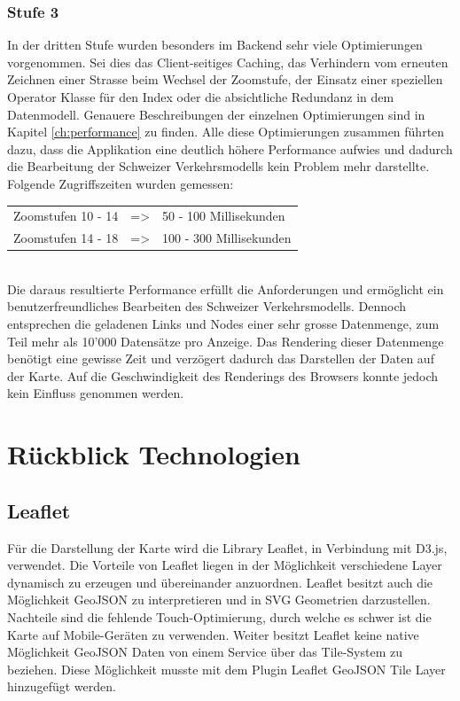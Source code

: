 \subsubsection*{Stufe 3}
In der dritten Stufe wurden besonders im Backend sehr viele Optimierungen vorgenommen. Sei dies das Client-seitiges Caching, das Verhindern vom erneuten Zeichnen einer Strasse beim Wechsel der Zoomstufe, der Einsatz einer speziellen Operator Klasse für den Index oder die absichtliche Redundanz in dem Datenmodell. Genauere Beschreibungen der einzelnen Optimierungen sind in Kapitel \ref{ch:performance}  zu finden. Alle diese Optimierungen zusammen führten dazu, dass die Applikation eine deutlich höhere Performance aufwies und dadurch die Bearbeitung der Schweizer Verkehrsmodells kein Problem mehr darstellte.\\
Folgende Zugriffszeiten wurden gemessen:\\[0.3cm]
\begin{tabular}{ l c l}
Zoomstufen 10 - 14 & => & 50 - 100 Millisekunden \\
Zoomstufen 14 - 18 & => & 100 - 300 Millisekunden \\ 
\end{tabular}\\[0.3cm]
Die daraus resultierte Performance erfüllt die Anforderungen und ermöglicht ein benutzerfreundliches Bearbeiten des Schweizer Verkehrsmodells. Dennoch entsprechen die geladenen Links und Nodes einer sehr grosse Datenmenge, zum Teil mehr als 10'000 Datensätze pro Anzeige. Das Rendering dieser Datenmenge benötigt eine gewisse Zeit und verzögert dadurch das Darstellen der Daten auf der Karte. Auf die Geschwindigkeit des Renderings des Browsers konnte jedoch kein Einfluss genommen werden.
\section{Rückblick Technologien}
\subsection*{Leaflet}
Für die Darstellung der Karte wird die Library Leaflet, in Verbindung mit D3.js, verwendet. Die Vorteile von Leaflet liegen in der Möglichkeit verschiedene Layer dynamisch zu erzeugen und übereinander anzuordnen. Leaflet besitzt auch die Möglichkeit GeoJSON zu interpretieren und in SVG Geometrien darzustellen. Nachteile sind die fehlende Touch-Optimierung, durch welche es schwer ist die Karte auf Mobile-Geräten zu verwenden. Weiter besitzt Leaflet keine native Möglichkeit GeoJSON Daten von einem Service über das Tile-System zu beziehen. Diese Möglichkeit musste mit dem Plugin Leaflet GeoJSON Tile Layer hinzugefügt werden.
